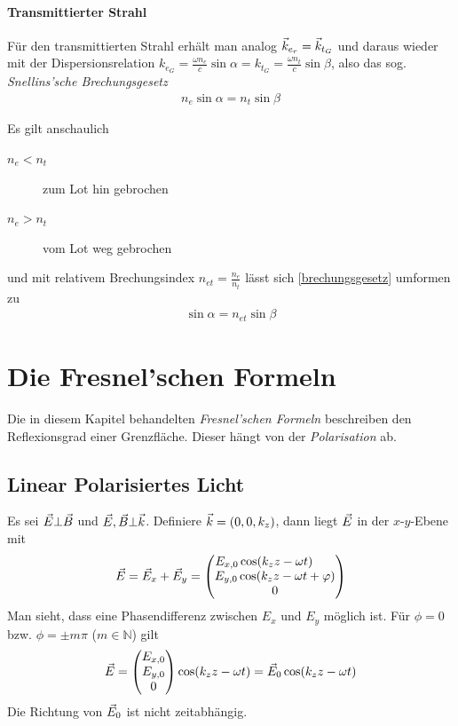 \paragraph{Transmittierter Strahl} Für den transmittierten Strahl
erhält man analog $\vec{k}_{e_r} = \vec{k}_{t_G}$ und daraus wieder mit
der Dispersionsrelation
$k_{e_G} = \frac{\omega n_e}{c}\sin\alpha 
= k_{t_G} =  \frac{\omega n_t}{c}\sin\beta$, also das sog.
\emph{Snellins'sche  Brechungsgesetz}%
\begin{gather}
  n_e\sin\alpha = n_t\sin\beta
  \label{brechungsgesetz}
\end{gather}

Es gilt anschaulich
\begin{description}
\item[$n_e<n_t$] zum Lot hin gebrochen
\item[$n_e>n_t$] vom Lot weg gebrochen
\end{description}
und mit relativem Brechungsindex $n_{et}=\frac{n_e}{n_t}$ lässt sich
\eqref{brechungsgesetz} umformen zu
\begin{gather*}
  \sin\alpha = n_{et} \sin\beta
\end{gather*}


\section{Die Fresnel'schen Formeln}
Die in diesem Kapitel behandelten 
\emph{Fresnel'schen Formeln}
beschreiben den Reflexionsgrad einer Grenzfläche.
Dieser hängt von der \emph{Polarisation} ab.

\subsection{Linear Polarisiertes Licht}%
Es sei $\vec{E}\bot\vec{B}$ und $\vec{E},\vec{B}\bot\vec{k}$.
Definiere $\vec{k}= (0,0,k_z)$, dann liegt $\vec{E}$ in der $x$-$y$-Ebene
mit
\begin{gather*}
  \vec{E} = \vec{E}_x + \vec{E}_y 
  =\begin{pmatrix}
    E_{x,0} \cos(k_z z - \omega t)\phantom{~+ \varphi}\\
    E_{y,0} \cos(k_z z - \omega t + \varphi)\\
    0
  \end{pmatrix}
\end{gather*}
Man sieht, dass eine Phasendifferenz zwischen $E_x$ und $E_y$
möglich ist. Für $\phi=0$ bzw. $\phi=\pm m\pi$ ($m\in\mathds{N}$) gilt
\begin{gather*}
  \vec{E} = \begin{pmatrix} E_{x,0}\\E_{y,0}\\0 \end{pmatrix}
  \cos(k_zz - \omega t)
  = \vec{E}_0  \cos(k_zz - \omega t)
\end{gather*}
Die Richtung von $\vec{E}_0$ ist nicht zeitabhängig.

